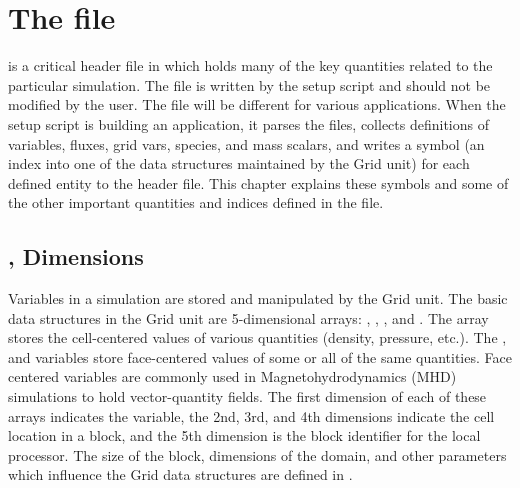 \chapter{The  file}
\label{Chp:Simulation.h}

is a critical header file in \flashx which
holds many of the key quantities related to the particular
simulation. The  file is written by the setup script
and should not be modified by the user.  
The  file will be different
for various applications.  When the setup script is building an
application, it parses the  files, collects definitions of
variables, fluxes, grid vars, species, and mass scalars, and writes 
a symbol (an index into one of the data structures maintained by
the \unit{Grid} unit)
for each defined entity to the  header file.
This chapter explains these symbols and some of the other 
important quantities and indices defined in the  file.


\newcommand{\htabopt}[1]{\multicolumn{2}{l}{\code{#1}}\\*[1ex]}
\newcommand{\htr}{\\[1ex]}


\section{,  Dimensions}
\label{Sec:FlashHdimensions}
Variables in a simulation are stored and manipulated by the
\unit{Grid} unit.  The basic data structures in the \unit{Grid} unit are
5-dimensional arrays: , , , and
.  The
array  stores the cell-centered values of various quantities
(density, pressure, etc.).  The ,  and
 variables store face-centered values of some or all of
the same quantities.  Face centered variables are commonly used in Magnetohydrodynamics (MHD)
simulations to hold vector-quantity fields.  The first dimension of
each of these arrays indicates the variable, the 2nd, 3rd, and 4th
dimensions indicate the cell location in a block, and the 5th dimension is
the block identifier for the local processor.  The size of the block,
dimensions of the domain, and other parameters which influence the
\unit{Grid} data structures are defined in .

